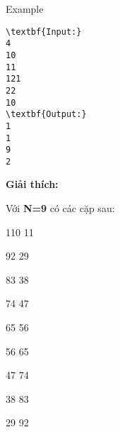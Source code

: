 Example
\begin{verbatim}
\textbf{Input:}
4
10
11
121
22
10
\textbf{Output:}
1
1
9
2\end{verbatim}

\textbf{Giải thích:}


Với\textbf{ N=9} có các cặp sau:


110 11


92 29


83 38


74 47


65 56


56 65


47 74


38 83


29 92